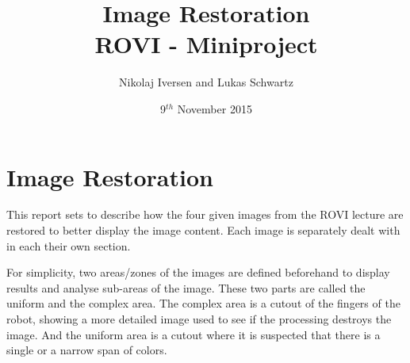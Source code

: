 \documentclass[12pt,a4paper,conference]{IEEEtran}
\begin{document}
\raggedbottom

\title{Image Restoration\\ \large{ROVI - Miniproject}}
\author{Nikolaj Iversen and Lukas Schwartz}
\date{9$^{th}$ November 2015}

\maketitle

\section{Image Restoration}
This report sets to describe how the four given images from the ROVI lecture are restored to better display the image content.
Each image is separately dealt with in each their own section.

For simplicity, two areas/zones of the images are defined beforehand to display results and analyse sub-areas of the image.
These two parts are called the uniform and the complex area.
The complex area is a cutout of the fingers of the robot, showing a more detailed image used to see if the processing destroys the image.
And the uniform area is a cutout where it is suspected that there is a single or a narrow span of colors.










\end{document}
